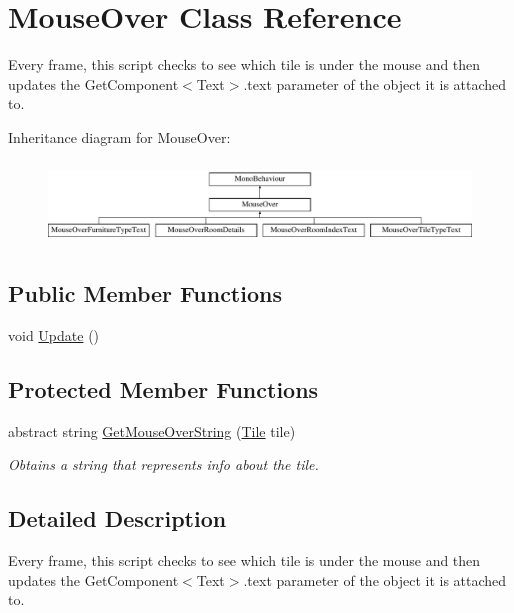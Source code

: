 \hypertarget{class_mouse_over}{}\section{Mouse\+Over Class Reference}
\label{class_mouse_over}


Every frame, this script checks to see which tile is under the mouse and then updates the Get\+Component$<$\+Text$>$.\+text parameter of the object it is attached to.  


Inheritance diagram for Mouse\+Over\+:\begin{figure}[H]
\begin{center}
\leavevmode
\includegraphics[height=2.210526cm]{class_mouse_over}
\end{center}
\end{figure}
\subsection*{Public Member Functions}
\begin{DoxyCompactItemize}
\item 
void \hyperlink{class_mouse_over_aa48d29c8e031498d5a4a32e9e290a3e9}{Update} ()
\end{DoxyCompactItemize}
\subsection*{Protected Member Functions}
\begin{DoxyCompactItemize}
\item 
abstract string \hyperlink{class_mouse_over_a9878f4e4b19afa1056f4386aa0e67452}{Get\+Mouse\+Over\+String} (\hyperlink{class_tile}{Tile} tile)
\begin{DoxyCompactList}\small\item\em Obtains a string that represents info about the tile. \end{DoxyCompactList}\end{DoxyCompactItemize}


\subsection{Detailed Description}
Every frame, this script checks to see which tile is under the mouse and then updates the Get\+Component$<$\+Text$>$.\+text parameter of the object it is attached to. 



